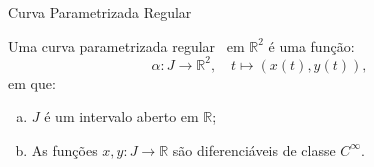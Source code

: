 \begin{frame}{Curva Parametrizada Regular}
  \begin{definition}\label{def:curva-parametrizada-regular}
    Uma curva parametrizada regular~\cite{lamport1994document} em
    \(\mathbb{R}^{2}\) é uma função:
    \[
      \alpha:J\to{\mathbb{R}^{2}},\quad
      t\mapsto(x(t),y(t)),
    \]
    em que:
    \begin{enumerate}[a)]
      \item
        \(J\) é um intervalo aberto em \(\mathbb{R}\);
      \item
        As funções \(x,y:J\to\mathbb{R}\) são diferenciáveis de classe
        \(C^{\infty}\).
    \end{enumerate}
  \end{definition}
\end{frame}
